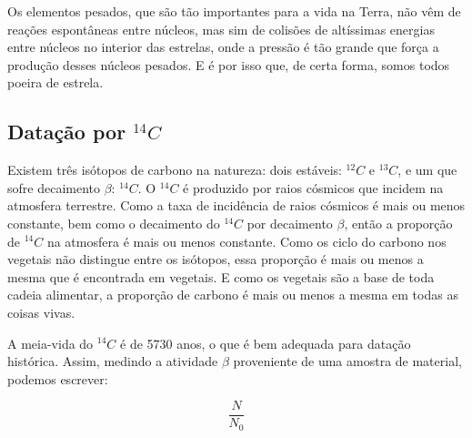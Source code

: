 \documentclass{article}
\begin{document}
Os elementos pesados, que s\~ao t\~ao importantes para a vida na Terra, n\~ao v\^em de rea\c c\~oes espont\^aneas entre n\'ucleos, mas sim de colis\~oes de alt\'issimas energias entre n\'ucleos no interior das estrelas, onde a press\~ao \'e t\~ao grande que for\c ca a produ\c c\~ao desses n\'ucleos pesados. E \'e por isso que, de certa forma, somos todos poeira de estrela.

\subsection{Data\c c\~ao por ${}^{14}C$}

Existem tr\^es is\'otopos de carbono na natureza: dois est\'aveis: ${}^{12}C$ e ${}^{13}C$, e um que sofre decaimento $\beta$: ${}^{14}C$. O ${}^{14}C$ \'e produzido por raios c\'osmicos que incidem na atmosfera terrestre. Como a taxa de incid\^encia de raios c\'osmicos \'e mais ou menos constante, bem como o decaimento do ${}^{14}C$ por decaimento $\beta$, ent\~ao a propor\c c\~ao de ${}^{14}C$ na atmosfera \'e mais ou menos constante. Como os ciclo do carbono nos vegetais n\~ao distingue entre os is\'otopos, essa propor\c c\~ao \'e mais ou menos a mesma que \'e encontrada em vegetais. E como os vegetais s\~ao a base de toda cadeia alimentar, a propor\c c\~ao de carbono \'e mais ou menos a mesma em todas as coisas vivas.

A meia-vida do ${}^{14}C$ \'e de 5730 anos, o que \'e bem adequada para data\c c\~ao hist\'orica. Assim, medindo a atividade $\beta$ proveniente de uma amostra de material, podemos escrever:

\begin{equation}
\frac{N}{N_0}
\end{equation}
\end{document}
